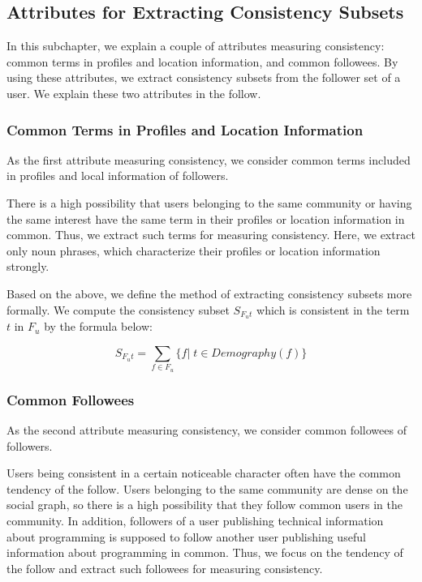 \subsection{Attributes for Extracting Consistency Subsets}
\label{subsec:Attributes}

In this subchapter, we explain a couple of attributes measuring
consistency: common terms in profiles and location information, and
common followees.  By using these attributes, we extract consistency
subsets from the follower set of a user.  We explain these two
attributes in the follow.

\subsubsection{Common Terms in Profiles and Location Information}
\label{subsec:Terms}

As the first attribute measuring consistency, we consider common terms
included in profiles and local information of followers.

There is a high possibility that users belonging to the same community
or having the same interest have the same term in their profiles or
location information in common.  Thus, we extract such terms for
measuring consistency.  Here, we extract only noun phrases, which
characterize their profiles or location information strongly.

Based on the above, we define the method of extracting consistency
subsets more formally.  We compute the consistency subset $S_{F_ut}$
which is consistent in the term $t$ in $F_u$ by the formula below:

\vspace{-1ex}
\[
 S_{F_ut} =  \sum_{f \in F_u} \{f|\;t \in \mathit{Demography}(f) \}
\]
\vspace{-2ex}


\subsubsection{Common Followees}
\label{subsec:Followees}

As the second attribute measuring consistency, we consider common
followees of followers.

Users being consistent in a certain noticeable character often have
the common tendency of the follow.  Users belonging to the same
community are dense on the social graph, so there is a high possibility
that they follow common users in the community.  In addition, followers of
a user publishing technical information about programming is supposed
to follow another user publishing useful information about programming
in common.  Thus, we focus on the tendency of the follow and extract
such followees for measuring consistency.

